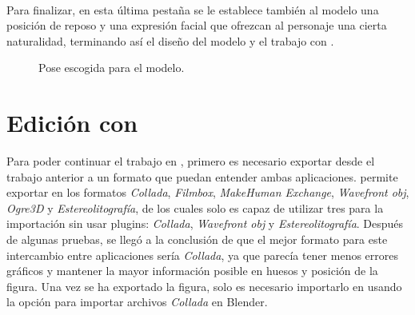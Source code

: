 \documentclass{subfiles}
\begin{document}
    \paragraph{}
    Para finalizar, en esta última pestaña se le establece también al modelo una posición de reposo y una expresión facial que ofrezcan al personaje una cierta naturalidad, terminando así el diseño del modelo y el trabajo con \makehuman.
    
    \begin{figure}[H]
    \centering
    \caption{Pose escogida para el modelo.}
    \label{fig:4.1.model_pose}
    \end{figure}
    
    \section{Edición con \blender}
    \label{sec:edicion_con_blender}

    Para poder continuar el trabajo en \blender, primero es necesario exportar desde \makehuman el trabajo anterior a un formato que puedan entender ambas aplicaciones. \makehuman permite exportar en los formatos \textit{Collada}, \textit{Filmbox}, \textit{MakeHuman Exchange}, \textit{Wavefront obj}, \textit{Ogre3D} y \textit{Estereolitografía}, de los cuales \blender solo es capaz de utilizar tres para la importación sin usar plugins: \textit{Collada}, \textit{Wavefront obj} y \textit{Estereolitografía}. Después de algunas pruebas, se llegó a la conclusión de que el mejor formato para este intercambio entre aplicaciones sería \textit{Collada}, ya que parecía tener menos errores gráficos y mantener la mayor información posible en huesos y posición de la figura. Una vez se ha exportado la figura, solo es necesario importarlo en \blender usando la opción para importar archivos \textit{Collada} en Blender.
\end{document}
